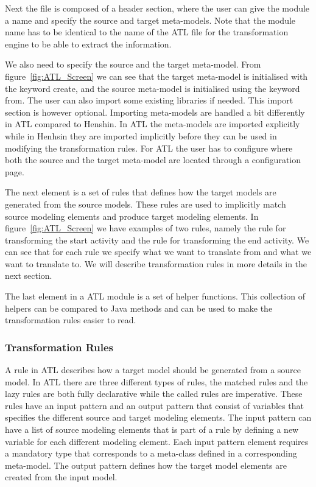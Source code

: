 Next the file is composed of a header section, where the user can give the
module a name and specify the source and target meta-models. Note that the
module name has to be identical to the name of the ATL file for the
transformation engine to be able to extract the information.

We also need to specify the source and the target meta-model. From
figure~\ref{fig:ATL_Screen} we can see that the target meta-model is initialised 
with the keyword create, and the source meta-model is initialised using the
keyword from. The user can also import some existing libraries if needed. This
import section is however optional. Importing meta-models are handled a bit
differently in ATL compared to Henshin. In ATL the meta-models are imported
explicitly while in Henhsin they are imported implicitly before they can be used
in modifying the transformation rules. For ATL the user has to configure where
both the source and the target meta-model are located through a configuration
page. 

The next element is a set of rules that defines how the target models are
generated from the source models. These rules are used to implicitly match
source modeling elements and produce target modeling elements. In
figure~\ref{fig:ATL_Screen} we have examples of two rules, namely the rule for
transforming the start activity and the rule for transforming the end activity.
We can see that for each rule we specify what we want to translate from and
what we want to translate to. We will describe transformation rules in more
details in the next section.

The last element in a ATL module is a set of helper functions. This collection
of helpers can be compared to Java methods and can be used to make the
transformation rules easier to read.

\subsubsection*{Transformation Rules}

A rule in ATL describes how a target model should be generated from a source
model. In ATL there are three different types of rules, the matched rules and
the lazy rules are both fully declarative while the called rules are imperative.
These rules have an input pattern and an output pattern that consist of
variables that specifies the different source and target modeling elements. The
input pattern can have a list of source modeling elements that is part of a
rule by defining a new variable for each different modeling element. Each input
pattern element requires a mandatory type that corresponds to a meta-class
defined in a corresponding meta-model. The output pattern defines how the target
model elements are created from the input model.

